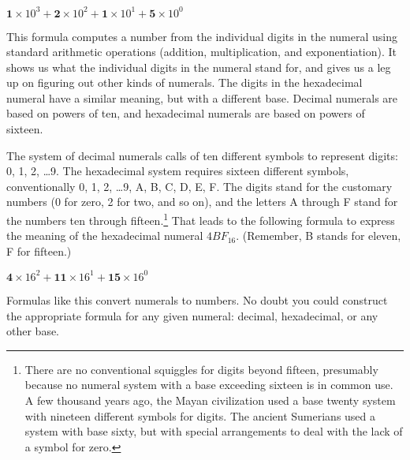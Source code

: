\begin{center}
$\textbf{1} \times 10^3 + \textbf{2} \times 10^2 + \textbf{1} \times 10^1 + \textbf{5} \times 10^0$
\end{center}

This formula computes a number from the individual digits
in the numeral using standard arithmetic operations
(addition, multiplication, and exponentiation).
It shows us what the individual digits in the numeral stand for,
and gives us a leg up on figuring out other kinds of numerals.
The digits in the hexadecimal numeral have a similar meaning,
but with a different base. Decimal numerals are based on
powers of ten, and hexadecimal numerals are based on powers of sixteen.

The system of decimal numerals calls of ten different symbols to represent digits:
0, 1, 2, \dots 9.
The hexadecimal system requires sixteen different symbols, conventionally
0, 1, 2, \dots 9, A, B, C, D, E, F.
The digits stand for the customary numbers
(0 for zero, 2 for two, and so on),
and the letters A through F
stand for the numbers ten through fifteen.\footnote{There
are no conventional squiggles for digits beyond fifteen,
presumably because no numeral system
with a base exceeding sixteen is in common use.
A few thousand years ago, the Mayan civilization used a base twenty system
with nineteen different symbols for digits.
The ancient Sumerians used a system with base sixty,
but with special arrangements to deal with the lack of a symbol for zero.}
That leads to the following
formula to express the meaning of the hexadecimal numeral $4BF_{16}$.
(Remember, B stands for eleven, F for fifteen.)
\begin{center}
$\textbf{4} \times 16^2 + \textbf{11} \times 16^1 + \textbf{15} \times 16^0$
\end{center}
Formulas like this
convert numerals to numbers.
No doubt you could construct the appropriate formula
for any given numeral: decimal, hexadecimal, or any other base.

